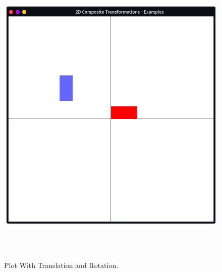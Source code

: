 \documentclass[12pt, a4]{article}
\begin{document}
\newpage
\subsection*{}
\begin{flushleft}

\end{flushleft}


\newpage
\subsection*{}
\begin{figure}[h]
\centering
\caption{Plot With Translation and Rotation.}
\includegraphics[height=15cm, width=15cm]{Outputs/Output-1.png}
\end{figure}

\newpage
\end{document}
